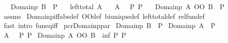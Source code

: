 \begin{isabellebody}
\ \ \ {\isachardoublequoteopen}Domainp\ B\ {\isacharequal}{\kern0pt}\ P{\isachardoublequoteclose}\isanewline
\ \ \ {\isachardoublequoteopen}left{\isacharunderscore}{\kern0pt}total\ A{\isachardoublequoteclose}\isanewline
\ \ \ {\isachardoublequoteopen}{\isacharparenleft}{\kern0pt}A\ {\isacharequal}{\kern0pt}{\isacharequal}{\kern0pt}{\isacharequal}{\kern0pt}{\isachargreater}{\kern0pt}\ {\isacharparenleft}{\kern0pt}{\isacharequal}{\kern0pt}{\isacharparenright}{\kern0pt}{\isacharparenright}{\kern0pt}\ P{\isacharprime}{\kern0pt}\ P{\isachardoublequoteclose}\isanewline
\ \ \ {\isachardoublequoteopen}Domainp\ {\isacharparenleft}{\kern0pt}A\ OO\ B{\isacharparenright}{\kern0pt}\ {\isacharequal}{\kern0pt}\ P{\isacharprime}{\kern0pt}{\isachardoublequoteclose}\isanewline
%
\isadelimproof
%
\endisadelimproof
%
\isatagproof
{}\isamarkupfalse%
\ assms\isanewline
{}\isamarkupfalse%
\ Domainp{\isacharunderscore}{\kern0pt}iff{\isacharbrackleft}{\kern0pt}abs{\isacharunderscore}{\kern0pt}def{\isacharbrackright}{\kern0pt}\ OO{\isacharunderscore}{\kern0pt}def\ bi{\isacharunderscore}{\kern0pt}unique{\isacharunderscore}{\kern0pt}def\ left{\isacharunderscore}{\kern0pt}total{\isacharunderscore}{\kern0pt}def\ rel{\isacharunderscore}{\kern0pt}fun{\isacharunderscore}{\kern0pt}def\isanewline
{}\isamarkupfalse%
\ {\isacharparenleft}{\kern0pt}fast\ intro{\isacharcolon}{\kern0pt}\ fun{\isacharunderscore}{\kern0pt}eq{\isacharunderscore}{\kern0pt}iff{\isacharparenright}{\kern0pt}%
\endisatagproof
{\isafoldproof}%
%
\isadelimproof
\isanewline
%
\endisadelimproof
\isanewline
{}\isamarkupfalse%
\ pcr{\isacharunderscore}{\kern0pt}Domainp{\isacharunderscore}{\kern0pt}par{\isacharcolon}{\kern0pt}\isanewline
{}\ {\isachardoublequoteopen}Domainp\ B\ {\isacharequal}{\kern0pt}\ P{}{\isachardoublequoteclose}\isanewline
{}\ {\isachardoublequoteopen}Domainp\ A\ {\isacharequal}{\kern0pt}\ P{}{\isachardoublequoteclose}\isanewline
{}\ {\isachardoublequoteopen}{\isacharparenleft}{\kern0pt}A\ {\isacharequal}{\kern0pt}{\isacharequal}{\kern0pt}{\isacharequal}{\kern0pt}{\isachargreater}{\kern0pt}\ {\isacharparenleft}{\kern0pt}{\isacharequal}{\kern0pt}{\isacharparenright}{\kern0pt}{\isacharparenright}{\kern0pt}\ P{}{\isacharprime}{\kern0pt}\ P{}{\isachardoublequoteclose}\isanewline
{}\ {\isachardoublequoteopen}Domainp\ {\isacharparenleft}{\kern0pt}A\ OO\ B{\isacharparenright}{\kern0pt}\ {\isacharequal}{\kern0pt}\ {\isacharparenleft}{\kern0pt}inf\ P{}\ P{}{\isacharprime}{\kern0pt}{\isacharparenright}{\kern0pt}{\isachardoublequoteclose}\isanewline

\end{isabellebody}
